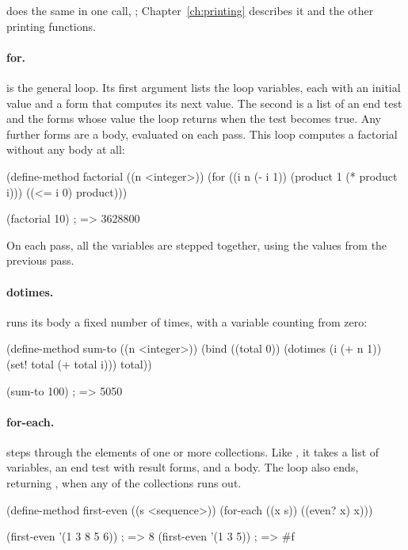 \noindent
{} does the same in one call, ; Chapter~\ref{ch:printing}
describes it and the other printing functions.

\paragraph{for.}
 is the general loop. Its first argument lists the loop
variables, each with an initial value and a form that computes its next
value. The second is a list of an end test and the forms whose value the
loop returns when the test becomes true. Any further forms are a body,
evaluated on each pass. This loop computes a factorial without any body
at all:

\begin{dylan}
(define-method factorial ((n <integer>))
  (for ((i n (- i 1))
        (product 1 (* product i)))
       ((<= i 0) product)))

(factorial 10)                  ; => 3628800
\end{dylan}

On each pass, all the variables are stepped together, using the values
from the previous pass.

\paragraph{dotimes.}
 runs its body a fixed number of times, with a variable
counting from zero:

\begin{dylan}
(define-method sum-to ((n <integer>))
  (bind ((total 0))
    (dotimes (i (+ n 1))
      (set! total (+ total i)))
    total))

(sum-to 100)                    ; => 5050
\end{dylan}

\paragraph{for-each.}
 steps through the elements of one or more collections.
Like , it takes a list of variables, an end test with result
forms, and a body. The loop also ends, returning , when any of
the collections runs out.

\begin{dylan}
(define-method first-even ((s <sequence>))
  (for-each ((x s))
            ((even? x) x)))

(first-even '(1 3 8 5 6))       ; => 8
(first-even '(1 3 5))           ; => #f
\end{dylan}

